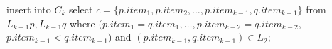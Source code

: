 insert into $C_k$
select $c = \{p.item_1,p.item_2,\ldots,p.item_{k-1},q.item_{k-1}\}$
from $L_{k-1}p,L_{k-1}q$
where  $(p.item_1 = q.item_1,\ldots,p.item_{k-2} = q.item_{k-2},$
          $p.item_{k-1} < q.item_{k-1})$
		   and
          $\left(p.item_{k-1}, q.item_{k-1}\right) \in L_2$;
